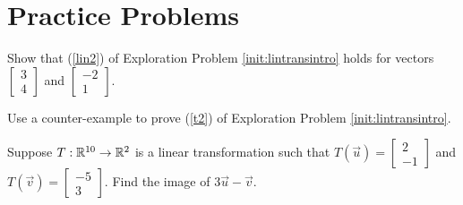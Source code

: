 \documentclass{ximera}
\begin{document}
\begin{example}
\begin{explanation}
\begin{image}[3in]
\end{image}
\end{explanation}
\end{example}





\section*{Practice Problems}
\begin{problem}\label{prob:sum}

Show that (\ref{lin2}) of Exploration Problem \ref{init:lintransintro} holds for vectors $\begin{bmatrix}3\\4\end{bmatrix}$ and $\begin{bmatrix}-2\\1\end{bmatrix}$.
\end{problem}

\begin{problem}\label{prob:prob2}
Use a counter-example to prove (\ref{t2}) of Exploration Problem \ref{init:lintransintro}.
\end{problem}

\begin{problem}\label{prob:imageoflincomb}
Suppose $T:\mathbb{R}^{10}\rightarrow\mathbb{R}^2$ is a linear transformation such that $T(\vec{u})=\begin{bmatrix}2\\-1\end{bmatrix}$ and $T(\vec{v})=\begin{bmatrix}-5\\3\end{bmatrix}$.  Find the image of $3\vec{u}-\vec{v}$.
\end{problem}
\end{document}
